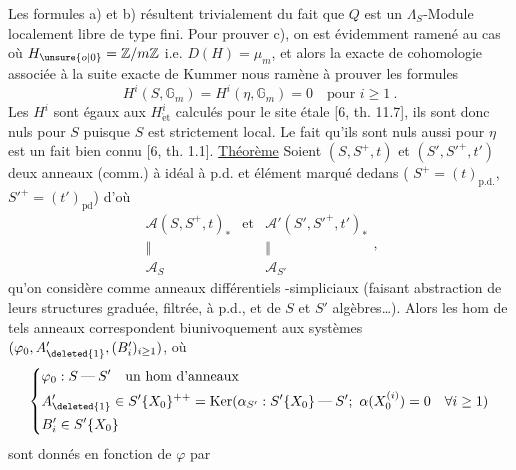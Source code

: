 Les formules a) et b) résultent trivialement du fait que $Q$ est un $\Lambda_S$-Module localement libre de type fini. Pour prouver c), on est évidemment ramené au cas où $H_{\unsure{o|0}}=\mathbb Z/m\mathbb Z$ i.e. $D(H)=\mu_m$, et alors la  exacte de cohomologie associée à la suite exacte de Kummer
nous ramène à prouver les formules
\[
 H^i(S,\mathbb G_m)=H^i(\eta,\mathbb G_m)=0\quad\text{pour }i\geq1\ .
\]
Les $H^i$ sont égaux aux $H^i_{\mathrm{\acute et}}$ calculés pour le site étale [6, th. 11.7], ils sont donc nuls pour $S$ puisque $S$ est strictement local. Le fait qu'ils sont nuls aussi pour $\eta$ est un fait bien connu [6, th. 1.1].
\uline{Théorème} Soient $(S,S^+,t)$ et $(S',S'^+,t')$ deux anneaux (comm.) à idéal à p.d. et élément marqué dedans
(\uline{} $S^+=(t)_{\mathrm{p.d.}}$, $S'^+=(t')_{\mathrm{pd}}$)
d'où
\[
 \begin{array}{ccc}\mathcal A(S,S^+,t)_*&\text{et}&
 \mathcal A'(S',S'^+,t')_*\\
 \Vert&&\Vert\\
 \mathcal A_S&&\mathcal A_{S'}\end{array},
\]
qu'on considère comme anneaux différentiels -simpliciaux
(faisant abstraction de leurs structures graduée, filtrée, à p.d., et de $S$ et $S'$ algèbres\ldots).
Alors les hom \inserted{$\varphi$} de tels anneaux  correspondent biunivoquement aux systèmes $(\varphi_0,A'_{\deleted{1}},(B'_i)_{i\geq1})$, où
\[
 \left\{\begin{aligned}
 &\varphi_0:S\mathbin{\text{---}}S'\quad\text{un hom d'anneaux}\\
 &A'_{\deleted{1}}\in S'\{X_0\}^{++}=\operatorname{Ker}(\alpha_{S'}:S'\{X_0\}\mathbin{\text{---}}S';\ \alpha(X_0^{(i)})=0\quad\forall i\geq1)\\
 &B'_i\in S'\{X_0\}
 \end{aligned}\right.
\]
sont donnés en fonction de $\varphi$ par
